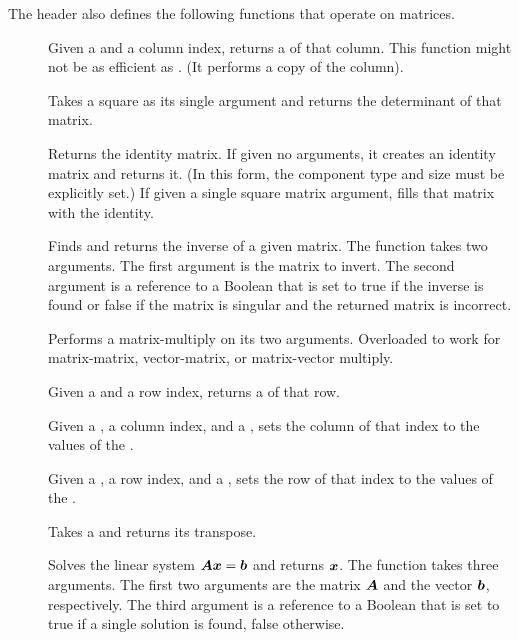 The  header also defines the following
functions that operate on matrices.

\begin{description}
\item[]  Given a 
  and a column index, returns a  of that column. This function
  might not be as efficient as . (It performs a copy of
  the column).
\item[]  Takes a square
   as its single argument and returns the
  determinant of that matrix.
\item[]  Returns the
  identity matrix. If given no arguments, it creates an identity matrix and
  returns it. (In this form, the component type and size must be explicitly
  set.) If given a single square matrix argument, fills that matrix with
  the identity.
\item[]  Finds and returns the
  inverse of a given matrix. The function takes two arguments. The first
  argument is the matrix to invert. The second argument is a reference to a
  Boolean that is set to true if the inverse is found or false if the
  matrix is singular and the returned matrix is incorrect.
\item[] Performs a matrix-multiply on its two
  arguments. Overloaded to work for matrix-matrix, vector-matrix, or
  matrix-vector multiply.
\item[]  Given a  and a
  row index, returns a  of that row.
\item[] Given a , a column
  index, and a , sets the column of that index to the values of
  the .
\item[] Given a , a row index,
  and a , sets the row of that index to the values of the
  .
\item[]  Takes a
   and returns its transpose.
\item[]  Solves the linear
  system $\matrixsym{A}\vectorsym{x} = \vectorsym{b}$ and returns
  $\vectorsym{x}$. The function takes three arguments. The first two
  arguments are the matrix $\matrixsym{A}$ and the vector $\vectorsym{b}$,
  respectively. The third argument is a reference to a Boolean that is set
  to true if a single solution is found, false otherwise.
\end{description}

